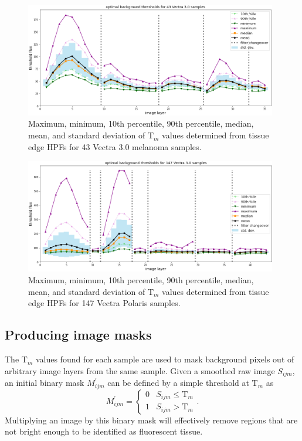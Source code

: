 \documentclass[letterpaper,11pt]{article}
\newcommand{\Tau}{\mathrm{T}}
\begin{document}
\begin{figure}[!ht]
\centering
\includegraphics[width=0.98\textwidth]{images/masking/optimal_background_thresholds_batches_3-9_vectra_samples}
\caption{\footnotesize Maximum, minimum, 10th percentile, 90th percentile, median, mean, and standard deviation of $\Tau_{m}$ values determined from tissue edge HPFs for 43 Vectra 3.0 melanoma samples.}
\label{fig:all_sample_thresholds_vectra}
\end{figure}

\begin{figure}[!ht]
\centering
\includegraphics[width=0.98\textwidth]{images/masking/optimal_background_thresholds_polaris_samples}
\caption{\footnotesize Maximum, minimum, 10th percentile, 90th percentile, median, mean, and standard deviation of $\Tau_{m}$ values determined from tissue edge HPFs for 147 Vectra Polaris samples.}
\label{fig:all_sample_thresholds_polaris}
\end{figure}

\clearpage

\subsection{Producing image masks}
\label{ssec:producing_image_masks}

The $\Tau_{m}$ values found for each sample are used to mask background pixels out of arbitrary image layers from the same sample. Given a smoothed raw image $S_{ijm}$, an initial binary mask $M^{\prime}_{ijm}$ can be defined by a simple threshold at $\Tau_{m}$ as
\begin{equation}
M^{\prime}_{ijm} = 
\begin{cases} 
      0 & S_{ijm} \leq \Tau_{m} \\
      1 & S_{ijm} > \Tau_{m} 
\end{cases}
 .
\end{equation}
Multiplying an image by this binary mask will effectively remove regions that are not bright enough to be identified as fluorescent tissue.
\end{document}
